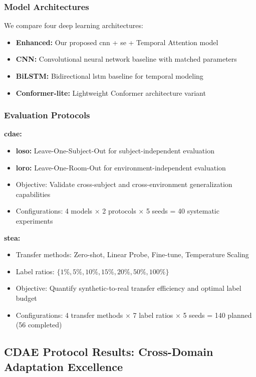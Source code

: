 \documentclass[journal]{IEEEtran}
\begin{document}
\subsubsection{Model Architectures}

We compare four deep learning architectures:
\begin{itemize}
\item \textbf{Enhanced:} Our proposed \gls{cnn} + \gls{se} + Temporal Attention model
\item \textbf{CNN:} Convolutional neural network baseline with matched parameters
\item \textbf{BiLSTM:} Bidirectional \gls{lstm} baseline for temporal modeling
\item \textbf{Conformer-lite:} Lightweight Conformer architecture variant
\end{itemize}

\subsubsection{Evaluation Protocols}

\textbf{\gls{cdae}:}
\begin{itemize}
\item \textbf{\gls{loso}:} Leave-One-Subject-Out for subject-independent evaluation
\item \textbf{\gls{loro}:} Leave-One-Room-Out for environment-independent evaluation
\item Objective: Validate cross-subject and cross-environment generalization capabilities
\item Configurations: 4 models × 2 protocols × 5 seeds = 40 systematic experiments
\end{itemize}

\textbf{\gls{stea}:}
\begin{itemize}
\item Transfer methods: Zero-shot, Linear Probe, Fine-tune, Temperature Scaling
\item Label ratios: $\{1\%, 5\%, 10\%, 15\%, 20\%, 50\%, 100\%\}$
\item Objective: Quantify synthetic-to-real transfer efficiency and optimal label budget
\item Configurations: 4 transfer methods × 7 label ratios × 5 seeds = 140 planned (56 completed)
\end{itemize}

\subsection{CDAE Protocol Results: Cross-Domain Adaptation Excellence}
\end{document}
